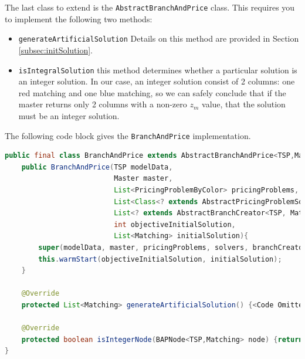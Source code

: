 \documentclass[a4paper]{article}
\newenvironment{myblock}[1]{%
    \tcolorbox[beamer,%
    noparskip,breakable,
    colback=lightBlueCodeBlock,colframe=darkBlueCodeBlock,%
    colbacklower=darkBlueCodeBlock!75!lightBlueCodeBlock,%
    coltitle=blueTitleCodeBlock,
    title=#1]}%
    {\endtcolorbox}
\newcommand{\code}[1]{\lstinline[language=java, style=seminar]!#1!}
\begin{document}
The last class to extend is the \code{AbstractBranchAndPrice} class. This requires you to implement the following two methods:
\begin{itemize}
 \item \code{generateArtificialSolution} Details on this method are provided in Section \ref{subsec:initSolution}.
 \item \code{isIntegralSolution} this method determines whether a particular solution is an integer solution. In our case, an integer solution consist of 2 columns: one red matching and one blue matching, so we can safely conclude that if the master returns only 2 columns with a non-zero $z_m$ value, that the solution must be an integer solution.
\end{itemize}
The following code block gives the \code{BranchAndPrice} implementation.
\begin{myblock}{BranchAndPrice}
\begin{lstlisting}[language=java, style=eclipseArticle, xleftmargin=2em]  
public final class BranchAndPrice extends AbstractBranchAndPrice<TSP,Matching, PricingProblemByColor> {
    public BranchAndPrice(TSP modelData,
                          Master master,
                          List<PricingProblemByColor> pricingProblems,
                          List<Class<? extends AbstractPricingProblemSolver<TSP, Matching, PricingProblemByColor>>> solvers,
                          List<? extends AbstractBranchCreator<TSP, Matching, PricingProblemByColor>> branchCreators,
                          int objectiveInitialSolution,
                          List<Matching> initialSolution){
        super(modelData, master, pricingProblems, solvers, branchCreators, 0, objectiveInitialSolution);
        this.warmStart(objectiveInitialSolution, initialSolution);
    }

    @Override
    protected List<Matching> generateArtificialSolution() {<Code Omitted>}

    @Override
    protected boolean isIntegerNode(BAPNode<TSP,Matching> node) {return node.getSolution().size()==2;}
}
\end{lstlisting}
\end{myblock}
\end{document}
